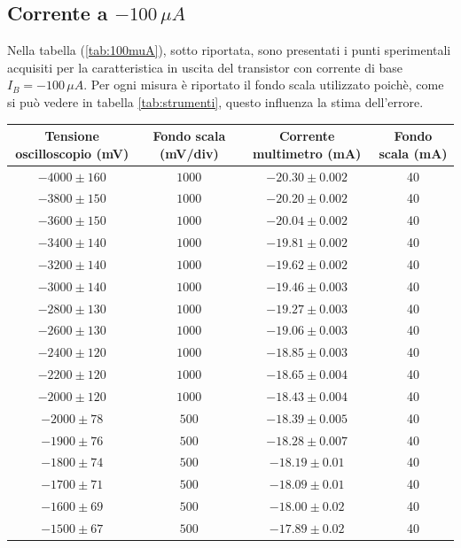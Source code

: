 \documentclass[]{article}
\begin{document}
\subsection{Corrente a $ -100\,\mu A $}
Nella tabella (\ref{tab:100muA}), sotto riportata, sono presentati i punti sperimentali acquisiti per la caratteristica in uscita del transistor con corrente di base $ I_{B}= -100\,\mu A $. Per ogni misura è riportato il fondo scala utilizzato poichè, come si può vedere in tabella \ref{tab:strumenti}, questo influenza la stima dell'errore.
	\begin{table}[H]
		\centering
	\begin{tabular}{|c|c|c|c|}
		\hline
		Tensione oscilloscopio (mV)& Fondo scala (mV/div) & Corrente multimetro (mA) &Fondo scala (mA)\\
		\hline
		$ -4000\pm 160 $ &$ 1000 $ & $ -20.30\pm 0.002 $ &40\\
		\hline
		$-3800\pm150 $ &$ 1000 $ & $ -20.20\pm0.002 $ &40 \\
		\hline
		$ -3600\pm 150 $ &$ 1000 $ & $ -20.04\pm 0.002 $ &40 \\
		\hline
		$ -3400\pm 140 $ &$ 1000 $ & $ -19.81\pm 0.002 $ &40 \\
		\hline
		$ -3200\pm 140 $ &$ 1000 $ & $-19.62\pm 0.002$ &40 \\
		\hline
		$ -3000\pm 140 $ &$ 1000 $ & $ -19.46\pm 0.003 $ &40 \\
		\hline
		$ -2800\pm 130 $ &$ 1000 $ & $ -19.27\pm 0.003 $ &40 \\
		\hline
		$ -2600\pm 130 $ &$ 1000 $ & $ -19.06\pm 0.003 $ &40 \\
		\hline
		$ -2400\pm 120 $ &$ 1000 $ & $ -18.85\pm 0.003 $ &40 \\
		\hline
		$ -2200\pm 120 $ &$ 1000 $ & $ -18.65\pm 0.004 $ &40 \\
		\hline
		$ -2000\pm 120 $ &$ 1000 $ & $ -18.43\pm0.004 $  &40\\
		\hline
		$ -2000\pm 78 $ &$ 500 $ & $ -18.39\pm0.005 $  &40\\
		\hline
		$ -1900\pm 76 $ &$ 500 $ & $ -18.28\pm0.007 $  &40\\
		\hline
		$ -1800\pm 74 $ &$ 500 $ & $ -18.19\pm 0.01 $ &40 \\
		\hline
		$ -1700\pm 71 $ &$ 500 $ & $ -18.09\pm 0.01 $ &40 \\
		\hline
		$ -1600\pm 69 $ &$ 500 $ & $ -18.00\pm 0.02 $ &40 \\
		\hline
		$ -1500\pm 67 $ &$ 500 $ & $ -17.89\pm 0.02 $ &40 \\

\end{tabular}
\end{table}
\end{document}

